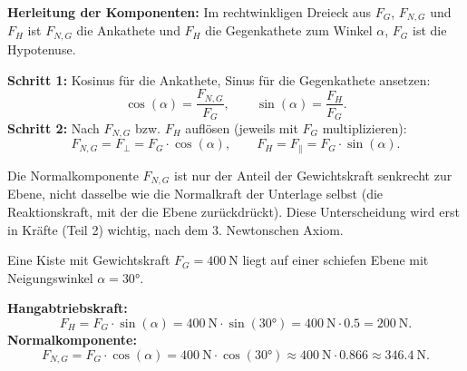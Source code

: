 \documentclass[addpoints,11pt,a4paper]{exam}
\begin{document}
\begin{theoriebox}
\textbf{Herleitung der Komponenten:} Im rechtwinkligen Dreieck aus $F_G$,
$F_{N,G}$ und $F_H$ ist $F_{N,G}$ die Ankathete und $F_H$ die Gegenkathete
zum Winkel $\alpha$, $F_G$ ist die Hypotenuse.

\textbf{Schritt 1:} Kosinus für die Ankathete, Sinus für die
Gegenkathete ansetzen:
\[
  \cos(\alpha) = \frac{F_{N,G}}{F_G}, \qquad \sin(\alpha) = \frac{F_H}{F_G}.
\]
\textbf{Schritt 2:} Nach $F_{N,G}$ bzw. $F_H$ auflösen (jeweils mit $F_G$
multiplizieren):
\[
  \boxed{F_{N,G} = F_\perp = F_G\cdot\cos(\alpha)}, \qquad \boxed{F_H = F_\parallel = F_G\cdot\sin(\alpha)}.
\]
\end{theoriebox}

\begin{hinweisbox}
Die Normalkomponente $F_{N,G}$ ist nur der Anteil der Gewichtskraft
senkrecht zur Ebene, nicht dasselbe wie die Normalkraft der Unterlage
selbst (die Reaktionskraft, mit der die Ebene zurückdrückt). Diese
Unterscheidung wird erst in Kräfte (Teil 2) wichtig, nach dem 3.
Newtonschen Axiom.
\end{hinweisbox}

\begin{beispielbox}
Eine Kiste mit Gewichtskraft $F_G=\SI{400}{\newton}$ liegt auf einer
schiefen Ebene mit Neigungswinkel $\alpha=\ang{30}$.

\textbf{Hangabtriebskraft:}
\[
  F_H = F_G\cdot\sin(\alpha) = \SI{400}{\newton}\cdot\sin(\ang{30}) = \SI{400}{\newton}\cdot0.5 = \SI{200}{\newton}.
\]
\textbf{Normalkomponente:}
\[
  F_{N,G} = F_G\cdot\cos(\alpha) = \SI{400}{\newton}\cdot\cos(\ang{30}) \approx \SI{400}{\newton}\cdot0.866 \approx \SI{346.4}{\newton}.
\]
\end{beispielbox}
\end{document}
